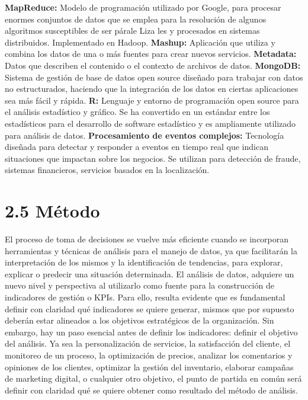 \documentclass[
  letterpaper,
  DIV=11,
  numbers=noendperiod]{scrreprt}
\begin{document}
\textbf{MapReduce:} Modelo de programación utilizado por Google, para
procesar enormes conjuntos de datos que se emplea para la resolución de
algunos algoritmos susceptibles de ser párale Liza les y procesados en
sistemas distribuidos. Implementado en Hadoop. \textbf{Mashup:}
Aplicación que utiliza y combina los datos de una o más fuentes para
crear nuevos servicios. \textbf{Metadata:} Datos que describen el
contenido o el contexto de archivos de datos. \textbf{MongoDB:} Sistema
de gestión de base de datos open source diseñado para trabajar con datos
no estructurados, haciendo que la integración de los datos en ciertas
aplicaciones sea más fácil y rápida. \textbf{R:} Lenguaje y entorno de
programación open source para el análisis estadístico y gráfico. Se ha
convertido en un estándar entre los estadísticos para el desarrollo de
software estadístico y es ampliamente utilizado para análisis de datos.
\textbf{Procesamiento de eventos complejos:} Tecnología diseñada para
detectar y responder a eventos en tiempo real que indican situaciones
que impactan sobre los negocios. Se utilizan para detección de fraude,
sistemas financieros, servicios basados en la localización.

\hypertarget{muxe9todo}{%
\section{2.5 Método}\label{muxe9todo}}

El proceso de toma de decisiones se vuelve más eficiente cuando se
incorporan herramientas y técnicas de análisis para el manejo de datos,
ya que facilitarán la interpretación de los mismos y la identificación
de tendencias, para explorar, explicar o predecir una situación
determinada. El análisis de datos, adquiere un nuevo nivel y perspectiva
al utilizarlo como fuente para la construcción de indicadores de gestión
o KPIs. Para ello, resulta evidente que es fundamental definir con
claridad qué indicadores se quiere generar, mismos que por supuesto
deberán estar alineados a los objetivos estratégicos de la organización.
Sin embargo, hay un paso esencial antes de definir los indicadores:
definir el objetivo del análisis. Ya sea la personalización de
servicios, la satisfacción del cliente, el monitoreo de un proceso, la
optimización de precios, analizar los comentarios y opiniones de los
clientes, optimizar la gestión del inventario, elaborar campañas de
marketing digital, o cualquier otro objetivo, el punto de partida en
común será definir con claridad qué se quiere obtener como resultado del
método de análisis.
\end{document}
